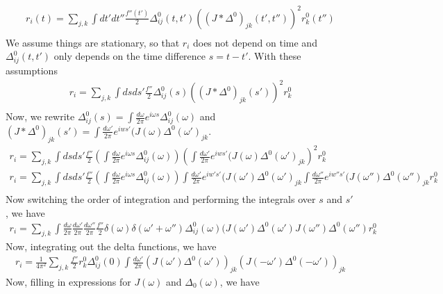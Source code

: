 \documentclass [12pt]{amsart}
\theoremstyle{definition}
\begin{document}
\begin{align*}
r_i(t) = \sum_{j,k} \int dt' dt'' \frac{f''(t')}{2}  \Delta_{ij}^0(t, t') \left( (J*\Delta^0)_{jk}(t', t'')\right)^2 r^0_k(t'')\\
\end{align*}
We assume things are stationary, so that $r_i$ does not depend on time and $ \Delta_{ij}^0(t, t')$ only depends on the time difference $s = t-t'$. With these assumptions
\begin{align*}
r_i = \sum_{j,k}\int ds ds'  \frac{f''}{2}  \Delta_{ij}^0(s) \left( (J*\Delta^0)_{jk}(s')\right)^2 r^0_k\\
\end{align*}
Now, we rewrite $\Delta^0_{ij}(s) = \int \frac{d\omega}{2\pi}e^{i\omega s}\Delta_{ij}^0(\omega)$ and  $(J*\Delta^0)_{jk}(s') = \int \frac{d\omega'}{2\pi} e^{iws'}(J(\omega)\Delta^0(\omega')_{jk}$.
\begin{align*}
r_i = \sum_{j,k}\int ds ds'  \frac{f''}{2} \left(\int \frac{d\omega}{2\pi}e^{i\omega s}\Delta_{ij}^0(\omega)\right)\left(\int \frac{d\omega'}{2\pi} e^{iws'}(J(\omega)\Delta^0(\omega')_{jk}\right)^2 r^0_k\\
r_i = \sum_{j,k}\int ds ds'  \frac{f''}{2} \left(\int \frac{d\omega}{2\pi}e^{i\omega s}\Delta_{ij}^0(\omega)\right)\int \frac{d\omega'}{2\pi} e^{iw's'}(J(\omega')\Delta^0(\omega')_{jk} \int \frac{d\omega''}{2\pi} e^{iw''s'}(J(\omega'')\Delta^0(\omega'')_{jk} r^0_k\\
\end{align*}
Now switching the order of integration and performing the integrals over $s$ and $s'$, we have 
\begin{align*}
r_i = \sum_{j,k} \int \frac{d\omega}{2\pi} \frac{d\omega'}{2\pi}\frac{d\omega''}{2\pi}  \frac{f''}{2}\delta(\omega) \delta(\omega'+\omega'') \Delta_{ij}^0(\omega) (J(\omega')\Delta^0(\omega') J(\omega'') \Delta^0(\omega'')r_k^0
\end{align*}
Now, integrating out the delta functions, we have 
\begin{align*}
r_i =  \frac{1}{4\pi^2}\sum_{j,k} \frac{f''}{2} r_k^0\Delta_{ij}^0(0)\int \frac{d\omega'}{2\pi} \left(J(\omega')\Delta^0(\omega')\right)_{jk} \left(J(-\omega') \Delta^0(-\omega')\right)_{jk}
\end{align*}
Now, filling in expressions for $J(\omega)$ and $\Delta_0(\omega)$, we have 
\end{document}
